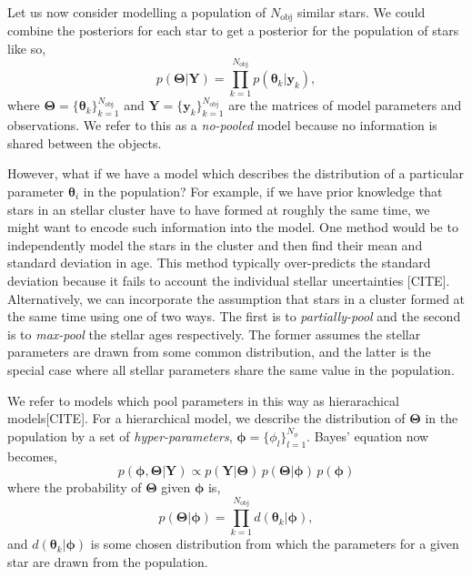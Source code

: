 Let us now consider modelling a population of $N_\mathrm{obj}$ similar stars. We could combine the posteriors for each star to get a posterior for the population of stars like so,
%
\begin{equation}
    p(\bm{\Theta}|\bm{Y}) = \prod_{k=1}^{N_\mathrm{obj}} p(\bm{\theta}_k|\bm{y}_k),
\end{equation}
%
where $\bm{\Theta} = \{\bm{\theta}_k\}_{k=1}^{N_\mathrm{obj}}$ and $\bm{Y} = \{\bm{y}_k\}_{k=1}^{N_\mathrm{obj}}$ are the matrices of model parameters and observations. We refer to this as a \emph{no-pooled} model because no information is shared between the objects. 

However, what if we have a model which describes the distribution of a particular parameter $\bm{\theta}_i$ in the population? For example, if we have prior knowledge that stars in an stellar cluster have to have formed at roughly the same time, we might want to encode such information into the model. One method would be to independently model the stars in the cluster and then find their mean and standard deviation in age. This method typically over-predicts the standard deviation because it fails to account the individual stellar uncertainties [CITE]. Alternatively, we can incorporate the assumption that stars in a cluster formed at the same time using one of two ways. The first is to \emph{partially-pool} and the second is to \emph{max-pool} the stellar ages respectively. The former assumes the stellar parameters are drawn from some common distribution, and the latter is the special case where all stellar parameters share the same value in the population.

We refer to models which pool parameters in this way as hierarachical models[CITE]. For a hierarchical model, we describe the distribution of $\bm{\Theta}$ in the population by a set of \emph{hyper-parameters}, $\bm{\phi} = \{ \phi_l \}_{l=1}^{N_\phi}$. Bayes' equation now becomes,
%
\begin{equation}
    p(\bm{\phi}, \bm{\Theta} | \bm{Y}) \propto p(\bm{Y} | \bm{\Theta}) \, p(\bm{\Theta} | \bm{\phi}) \, p(\bm{\phi})
\end{equation}
%
where the probability of $\bm{\Theta}$ given $\bm{\phi}$ is,
%
\begin{equation}
    p(\bm{\Theta} | \bm{\phi}) = \prod_{k=1}^{N_\mathrm{obj}} d(\bm{\theta}_k | \bm{\phi}),
\end{equation}
%
and $d(\bm{\theta}_k | \bm{\phi})$ is some chosen distribution from which the parameters for a given star are drawn from the population.

